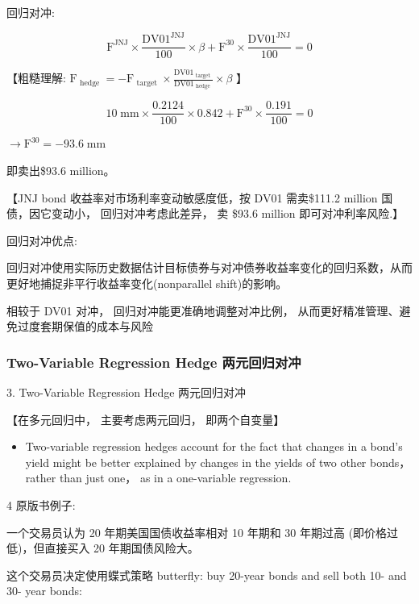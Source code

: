 回归对冲:

\[
{\mathrm{F}}^{\mathrm{{JNJ}}} \times  \frac{{\mathrm{{DV01}}}^{\mathrm{{JNJ}}}}{100} \times  \beta  + {\mathrm{F}}^{30} \times  \frac{{\mathrm{{DV01}}}^{\mathrm{{JNJ}}}}{100} = 0
\]

【粗糙理解: \({\mathrm{F}}_{\text{ hedge }} =  - {\mathrm{F}}_{\text{ target }} \times  \frac{{\mathrm{{DV01}}}_{\text{ target }}}{{\mathrm{{DV01}}}_{\text{ hedge }}} \times  \beta\) 】

\[
{10}\mathrm{\;{mm}} \times  \frac{0.2124}{100} \times  {0.842} + {\mathrm{F}}^{30} \times  \frac{0.191}{100} = 0
\]

\(\rightarrow  {\mathrm{F}}^{30} =  - {93.6}\mathrm{\;{mm}}\)

即卖出\$93.6 million。

【JNJ bond 收益率对市场利率变动敏感度低，按 DV01 需卖\$111.2 million 国债，因它变动小， 回归对冲考虑此差异， 卖 \$93.6 million 即可对冲利率风险.】

回归对冲优点:

回归对冲使用实际历史数据估计目标债券与对冲债券收益率变化的回归系数，从而更好地捕捉非平行收益率变化(nonparallel shift)的影响。

相较于 DV01 对冲， 回归对冲能更准确地调整对冲比例， 从而更好精准管理、避免过度套期保值的成本与风险



\subsubsection{ Two-Variable Regression Hedge 两元回归对冲 }

3. Two-Variable Regression Hedge 两元回归对冲

【在多元回归中， 主要考虑两元回归， 即两个自变量】

\begin{itemize}
\item Two-variable regression hedges account for the fact that changes in a bond's yield might be better explained by changes in the yields of two other bonds， rather than just one， as in a one-variable regression.
\end{itemize}

4 原版书例子:

 一个交易员认为 20 年期美国国债收益率相对 10 年期和 30 年期过高 (即价格过低)，但直接买入 20 年期国债风险大。

 这个交易员决定使用蝶式策略 butterfly: buy 20-year bonds and sell both 10- and 30- year bonds:

